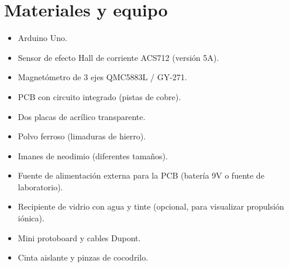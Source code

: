 \section*{Materiales y equipo}
\begin{itemize}
    \item Arduino Uno.
    \item Sensor de efecto Hall de corriente ACS712 (versión 5A).
    \item Magnetómetro de 3 ejes QMC5883L / GY-271.
    \item PCB con circuito integrado (pistas de cobre).
    \item Dos placas de acrílico transparente.
    \item Polvo ferroso (limaduras de hierro).
    \item Imanes de neodimio (diferentes tamaños).
    \item Fuente de alimentación externa para la PCB (batería 9V o fuente de laboratorio).
    \item Recipiente de vidrio con agua y tinte (opcional, para visualizar propulsión iónica).
    \item Mini protoboard y cables Dupont.
    \item Cinta aislante y pinzas de cocodrilo.
\end{itemize}

